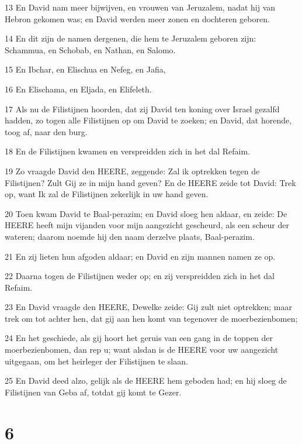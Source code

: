 \par 13 En David nam meer bijwijven, en vrouwen van Jeruzalem, nadat hij van Hebron gekomen was; en David werden meer zonen en dochteren geboren.
\par 14 En dit zijn de namen dergenen, die hem te Jeruzalem geboren zijn: Schammua, en Schobab, en Nathan, en Salomo.
\par 15 En Ibchar, en Elischua en Nefeg, en Jafia,
\par 16 En Elischama, en Eljada, en Elifeleth.
\par 17 Als nu de Filistijnen hoorden, dat zij David ten koning over Israel gezalfd hadden, zo togen alle Filistijnen op om David te zoeken; en David, dat horende, toog af, naar den burg.
\par 18 En de Filistijnen kwamen en verspreidden zich in het dal Refaim.
\par 19 Zo vraagde David den HEERE, zeggende: Zal ik optrekken tegen de Filistijnen? Zult Gij ze in mijn hand geven? En de HEERE zeide tot David: Trek op, want Ik zal de Filistijnen zekerlijk in uw hand geven.
\par 20 Toen kwam David te Baal-perazim; en David sloeg hen aldaar, en zeide: De HEERE heeft mijn vijanden voor mijn aangezicht gescheurd, als een scheur der wateren; daarom noemde hij den naam derzelve plaats, Baal-perazim.
\par 21 En zij lieten hun afgoden aldaar; en David en zijn mannen namen ze op.
\par 22 Daarna togen de Filistijnen weder op; en zij verspreidden zich in het dal Refaim.
\par 23 En David vraagde den HEERE, Dewelke zeide: Gij zult niet optrekken; maar trek om tot achter hen, dat gij aan hen komt van tegenover de moerbezienbomen;
\par 24 En het geschiede, als gij hoort het geruis van een gang in de toppen der moerbezienbomen, dan rep u; want alsdan is de HEERE voor uw aangezicht uitgegaan, om het heirleger der Filistijnen te slaan.
\par 25 En David deed alzo, gelijk als de HEERE hem geboden had; en hij sloeg de Filistijnen van Geba af, totdat gij komt te Gezer.

\chapter{6}

